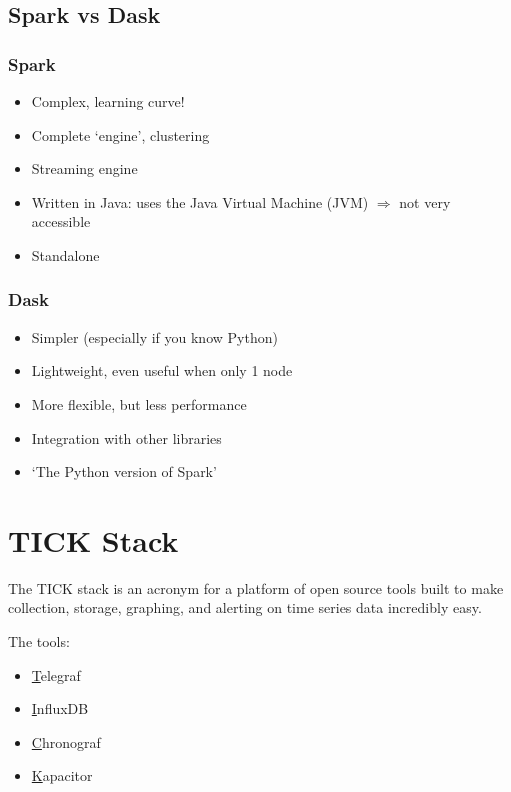 \documentclass{article}
\begin{document}
\subsection{Spark vs Dask}
\subsubsection{Spark}

\begin{itemize}
    \item Complex, learning curve!
    \item Complete `engine', clustering
    \item Streaming engine
    \item Written in Java: uses the Java Virtual Machine (JVM) $\Rightarrow$ not very accessible
    \item Standalone
\end{itemize}

\subsubsection{Dask}

\begin{itemize}
    \item Simpler (especially if you know Python)
    \item Lightweight, even useful when only  1 node
    \item More flexible, but less performance
    \item Integration with other libraries
    \item `The Python version of Spark'
\end{itemize}

\section{TICK Stack}

The TICK stack is an acronym for a platform of open source tools 
built to make collection, storage, graphing, and alerting on 
time series data incredibly easy.

The tools:

\begin{itemize}
    \item \underline{T}elegraf
    \item \underline{I}nfluxDB
    \item \underline{C}hronograf
    \item \underline{K}apacitor
\end{itemize}
\end{document}
